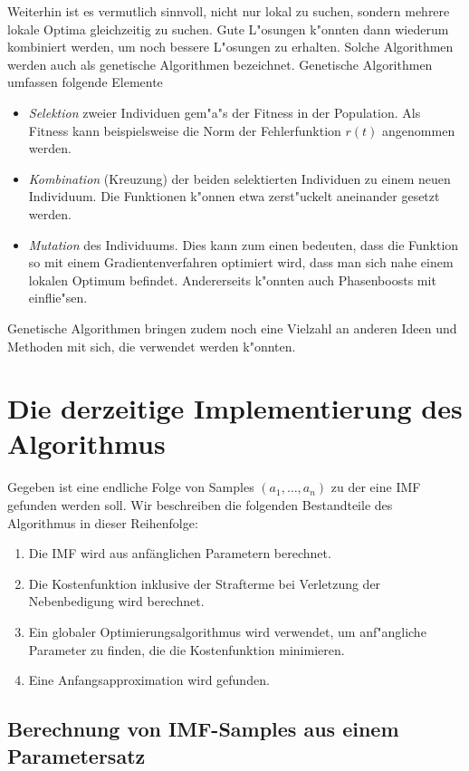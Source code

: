 \documentclass[a4paper]{scrartcl}
\begin{document}
Weiterhin ist es vermutlich sinnvoll, nicht nur lokal zu suchen, sondern mehrere lokale Optima gleichzeitig zu suchen. 
Gute L"osungen k"onnten dann wiederum kombiniert werden, um noch bessere L"osungen zu erhalten. 
Solche Algorithmen werden auch als genetische Algorithmen bezeichnet. 
Genetische Algorithmen umfassen folgende Elemente
\begin{itemize}
  \item {\em Selektion} zweier Individuen gem"a"s der Fitness in der Population. 
  Als Fitness kann beispielsweise die Norm der Fehlerfunktion $r(t)$ angenommen werden.  
  \item {\em Kombination} (Kreuzung) der beiden selektierten Individuen zu einem neuen Individuum. 
  Die Funktionen k"onnen etwa zerst"uckelt aneinander gesetzt werden.
  \item {\em Mutation} des Individuums. 
  Dies kann zum einen bedeuten, dass die Funktion so mit einem Gradientenverfahren optimiert wird, dass man sich nahe einem lokalen Optimum befindet. 
  Andererseits k"onnten auch Phasenboosts mit einflie"sen. 
\end{itemize}
Genetische Algorithmen bringen zudem noch eine Vielzahl an anderen Ideen und Methoden mit sich, die verwendet werden k"onnten. 


\section{Die derzeitige Implementierung des Algorithmus}

Gegeben ist eine endliche Folge von Samples $(a_1,\ldots,a_n)$ zu der eine IMF gefunden werden soll. 
Wir beschreiben die folgenden Bestandteile des Algorithmus in dieser Reihenfolge:
\begin{enumerate}[1.]
  \item Die IMF wird aus anfänglichen Parametern berechnet. 
  \item Die Kostenfunktion inklusive der Strafterme bei Verletzung der Nebenbedigung wird berechnet. 
  \item Ein globaler Optimierungsalgorithmus wird verwendet, um anf"angliche Parameter zu finden, die die Kostenfunktion minimieren. 
  \item Eine Anfangsapproximation wird gefunden. 
\end{enumerate}


\subsection{Berechnung von IMF-Samples aus einem Parametersatz}
\end{document}
